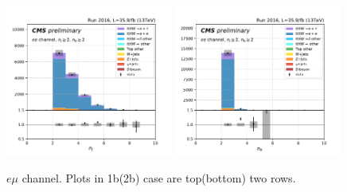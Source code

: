 \begin{figure}[ht]
    \includegraphics[width=0.49\textwidth]{chapters/Appendix/sectionPlots/figures/kinematics_pickles/ee/2b/ee_2b_nJets.pdf}
    \includegraphics[width=0.49\textwidth]{chapters/Appendix/sectionPlots/figures/kinematics_pickles/ee/2b/ee_2b_nBJets.pdf}
    
    \caption{$e\mu$ channel. Plots in 1b(2b) case are top(bottom) two rows.}
\end{figure}

